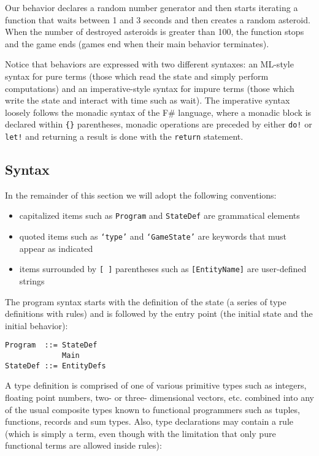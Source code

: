 Our behavior declares a random number generator and then starts iterating a function that waits between 1 and 3 seconds and then creates a random asteroid. When the number of destroyed asteroids is greater than 100, the function stops and the game ends (games end when their main behavior terminates).

Notice that behaviors are expressed with two different syntaxes: an ML-style syntax for pure terms (those which read the state and simply perform computations) and an imperative-style syntax for impure terms (those which write the state and interact with time such as wait). The imperative syntax loosely follows the monadic syntax of the F\# language, where a monadic block is declared within \texttt{\{\}} parentheses, monadic operations are preceded by either \texttt{do!} or \texttt{let!} and returning a result is done with the \texttt{return} statement.

\subsection{Syntax}
In the remainder of this section we will adopt the following conventions:
\begin{itemize}
\item capitalized items such as \texttt{Program} and \texttt{StateDef} are grammatical elements
\item quoted items such as \texttt{`type'} and \texttt{`GameState'} are keywords that must appear as indicated
\item items surrounded by \texttt{[ ]} parentheses such as \texttt{[EntityName]} are user-defined strings
\end{itemize}

The program syntax starts with the definition of the state (a series of type definitions with rules) and is followed by the entry point (the initial state and the initial behavior):

\begin{lstlisting}
Program  ::= StateDef
             Main
StateDef ::= EntityDefs
\end{lstlisting}

A type definition is comprised of one of various primitive types such as integers, floating point numbers, two- or three- dimensional vectors, etc. combined into any of the usual composite types known to functional programmers such as tuples, functions, records and sum types. Also, type declarations may contain a rule (which is simply a term, even though with the limitation that only pure functional terms are allowed inside rules):

